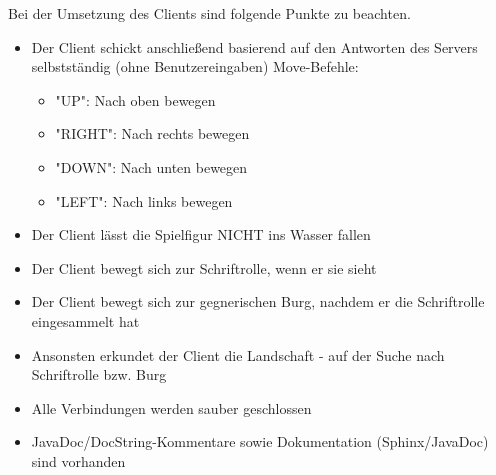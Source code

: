 \clearpage

Bei der Umsetzung des Clients sind folgende Punkte zu beachten.

\begin{itemize}
	\item Der Client schickt anschließend basierend auf den Antworten des Servers selbstständig (ohne Benutzereingaben) Move-Befehle:
	\begin{itemize}
		\item "UP": Nach oben bewegen
		\item "RIGHT": Nach rechts bewegen
		\item "DOWN": Nach unten bewegen
		\item "LEFT": Nach links bewegen
	\end{itemize}
	\item Der Client lässt die Spielfigur NICHT ins Wasser fallen
	\item Der Client bewegt sich zur Schriftrolle, wenn er sie sieht
	\item Der Client bewegt sich zur gegnerischen Burg, nachdem er die Schriftrolle eingesammelt hat
	\item Ansonsten erkundet der Client die Landschaft - auf der Suche nach Schriftrolle bzw. Burg
	\item Alle Verbindungen werden sauber geschlossen
	\item JavaDoc/DocString-Kommentare sowie Dokumentation (Sphinx/JavaDoc) sind vorhanden
\end{itemize}

\clearpage
